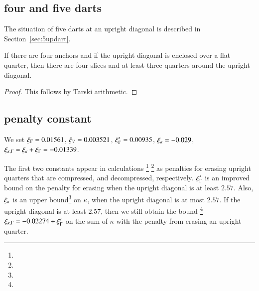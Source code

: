 \subsection{four and five darts} %
    \label{sec:five-anchors}



\begin{remark}\label{rem:5dart}
The situation of five darts at an upright diagonal is
described in Section~\ref{sec:5updart}.
\end{remark}


\begin{lemma}
If there are four anchors and if the upright diagonal is enclosed over a
flat quarter, then there are four slices and at least three
quarters around the upright diagonal.
\end{lemma}

\begin{proof}
This follows by Tarski arithmetic.
\end{proof}


\subsection{penalty constant}

\begin{definition}
We set $\xi_\Gamma = 0.01561$, $\xi_V = 0.003521$, $\xi_\Gamma'=0.00935$,
$\xi_\kappa=-0.029$, $\xi_{\kappa,\Gamma} = \xi_\kappa+\xi_\Gamma = -0.01339$.
\end{definition}

The first two constants appear in calculations%
\footnote{} %
\footnote{} %
as penalties for erasing upright quarters that are compressed, and
decompressed, respectively. $\xi_\Gamma'$ is an improved bound on the
penalty for erasing when the upright diagonal is at least $2.57$.
Also, $\xi_\kappa$ is an upper bound\footnote{} %
 on $\kappa$, when the
upright diagonal is at most $2.57$.  If the upright diagonal is at
least $2.57$, then we still obtain the bound%
\footnote{} %
$\xi_{\kappa,\Gamma} =-0.02274+\xi_\Gamma'$ on the sum of $\kappa$ with the
penalty from erasing an upright quarter.

